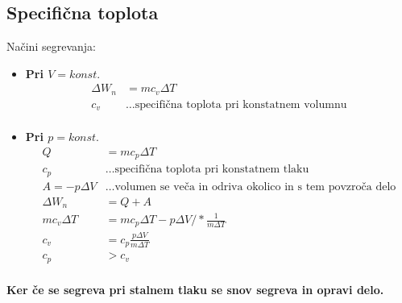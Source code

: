 {\color{indiagreen}\subsection{Specifična toplota}}
Načini segrevanja:
\begin{itemize}
	\item \textbf{Pri $V = konst.$}
	\begin{align*}
		\Delta W_n &= m c_v \Delta T\\
		c_v &\dots \text{specifična toplota pri konstatnem volumnu}\\
	\end{align*}
	\item \textbf{Pri $p = konst.$}
	\begin{align*}
		Q &= m c_p \Delta T\\
		c_p &\dots \text{specifična toplota pri konstatnem tlaku}\\
		A = -p \Delta V &\dots \text{volumen se veča in odriva okolico in s tem povzroča delo}\\
		\Delta W_n &= Q + A\\
		m c_v \Delta T &= m c_p \Delta T - p \Delta V /*\frac{1}{m \Delta T}\\
		c_v &= c_p \frac{p \Delta V}{m \Delta T}\\
		c_p &> c_v\\
	\end{align*}
\end{itemize}
\textbf{Ker če se segreva pri stalnem tlaku se snov segreva in opravi delo.}